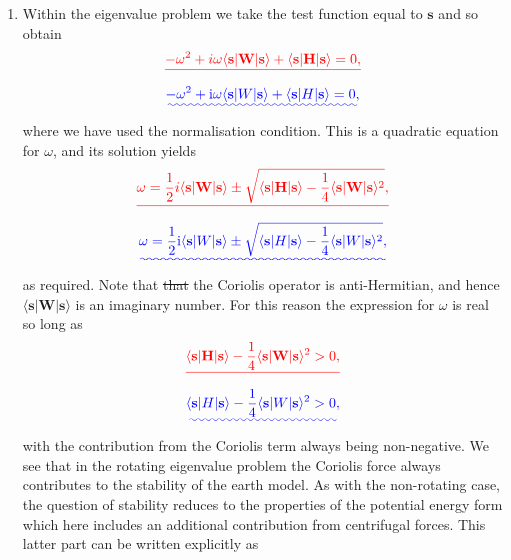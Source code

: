 \documentclass[a4paper,10pt]{paper}
\providecommand{\DIFadd}[1]{{\protect\color{blue}\uwave{#1}}} %
\providecommand{\DIFdel}[1]{{\protect\color{red}\sout{#1}}}                      %
\providecommand{\DIFaddbegin}{} %
\providecommand{\DIFaddend}{} %
\providecommand{\DIFdelbegin}{} %
\providecommand{\DIFdelend}{} %
\begin{document}
\begin{enumerate}
\item Within the eigenvalue problem we take the test function equal to $\mathbf{s}$ and so obtain
\DIFdelbegin \begin{displaymath}
    \DIFdel{-\omega^{2}+i\omega\langle \mathbf{s}|\mathbf{W}|\mathbf{s}\rangle+\langle \mathbf{s}|\mathbf{H}|\mathbf{s}\rangle=0,
}\end{displaymath}%
\DIFdelend \DIFaddbegin \begin{equation*}
    \DIFadd{-\omega^{2}+\ii\omega\langle \mathbf{s}|W|\mathbf{s}\rangle+\langle \mathbf{s}|H|\mathbf{s}\rangle=0,
}\end{equation*}\DIFaddend 
where we have used the normalisation condition. This is a quadratic equation for $\omega$, and its solution yields
\DIFdelbegin \begin{displaymath}
    \DIFdel{\omega=\frac{1}{2}i\langle \mathbf{s}|\mathbf{W}|\mathbf{s}\rangle\pm\sqrt{\langle \mathbf{s}|\mathbf{H}|\mathbf{s}\rangle-\frac{1}{4}\langle \mathbf{s}|\mathbf{W}|\mathbf{s}\rangle^{2}},
}\end{displaymath}%
\DIFdelend \DIFaddbegin \begin{equation*}
    \DIFadd{\omega=\frac{1}{2}\ii\langle \mathbf{s}|W|\mathbf{s}\rangle\pm\sqrt{\langle \mathbf{s}|H|\mathbf{s}\rangle-\frac{1}{4}\langle \mathbf{s}|W|\mathbf{s}\rangle^{2}},
}\end{equation*}\DIFaddend 
as required. Note that \DIFdelbegin \DIFdel{that }\DIFdelend the Coriolis operator is anti-Hermitian, and hence \DIFdelbegin \DIFdel{$\langle \mathbf{s}|\mathbf{W}|\mathbf{s}\rangle$ }\DIFdelend \DIFaddbegin \DIFadd{$\langle \mathbf{s}|W|\mathbf{s}\rangle$ }\DIFaddend is an imaginary number. For this reason the expression for $\omega$ is real so long as
\DIFdelbegin \begin{displaymath}
    \DIFdel{\langle \mathbf{s}|\mathbf{H}|\mathbf{s}\rangle-\frac{1}{4}\langle \mathbf{s}|\mathbf{W}|\mathbf{s}\rangle^{2}>0,
}\end{displaymath}%
\DIFdelend \DIFaddbegin \begin{equation*}
    \DIFadd{\langle \mathbf{s}|H|\mathbf{s}\rangle-\frac{1}{4}\langle \mathbf{s}|W|\mathbf{s}\rangle^{2}>0,
}\end{equation*}\DIFaddend 
with the contribution from the Coriolis term always being non-negative. We see that in the rotating eigenvalue problem the Coriolis force always contributes to the stability of the earth model. As with the non-rotating case, the question of stability reduces to the properties of the potential energy form which here includes an additional contribution from centrifugal forces. This latter part can be written explicitly as

\end{enumerate}
\end{document}
